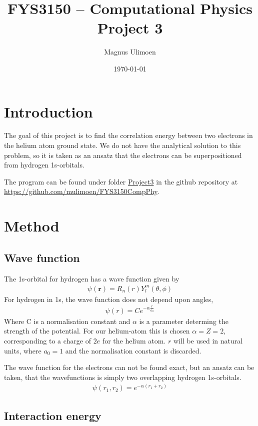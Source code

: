 \documentclass[11pt,a4paper,english,final]{article}
\title{FYS3150 -- Computational Physics\\Project 3}
\author{Magnus Ulimoen}
\date{\today}
\numberwithin{equation}{section}
\newcommand{\ve}[1]{\mathbf{#1}} %
\begin{document}
\maketitle


\section{Introduction}

The goal of this project is to find the correlation energy between two 
electrons in the helium atom ground state. We do not have the analytical 
solution to this problem, so it is taken as an ansatz that the electrons 
can be superpositioned from hydrogen 1s-orbitals.

The program can be found under folder \url{Project3} in the github 
repository at \url{https://github.com/mulimoen/FYS3150CompPhy}.

\section{Method}

\subsection{Wave function}

The 1s-orbital for hydrogen has a wave function given by
\begin{gather}
\psi(\ve{r}) = R_n(r)Y_l^m(\theta, \phi)
\end{gather}
For hydrogen in 1s, the wave function does not depend upon angles,
\begin{gather}
\psi(r) = C e^{-\alpha \frac{r}{a_0}}
\end{gather}
Where C is a normalisation constant and $\alpha$ is a parameter 
determing the strength of the potential. 
For our helium-atom this is chosen $\alpha = Z = 2$, corresponding to 
a charge of $2e$ for the helium atom. $r$ will be used in natural units, 
where $a_0 = 1$ and the normalisation constant is discarded.

The wave function for the electrons can not be found exact, but an 
ansatz can be taken, that the wavefunctions is simply two overlapping 
hydrogen 1s-orbitals.
\begin{gather}
\psi(r_1, r_2) = e^{-\alpha(r_1 + r_2)}
\end{gather}


\subsection{Interaction energy}
\end{document}
